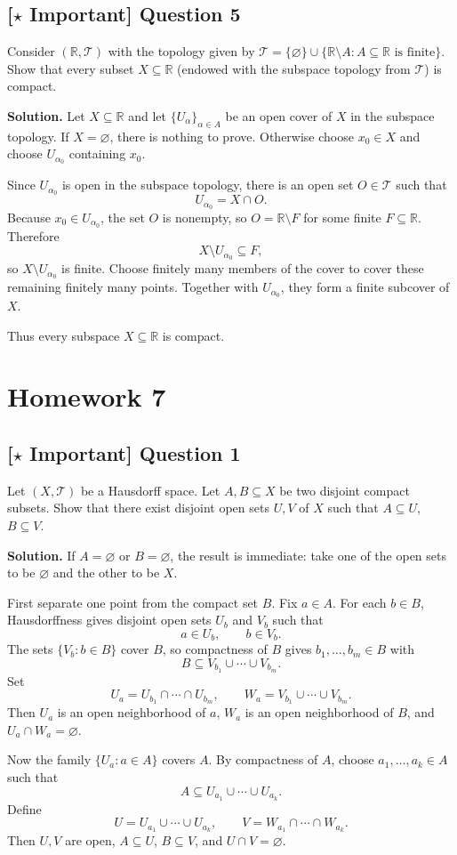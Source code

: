 \documentclass{article}
\newcommand{\R}{\mathbb{R}}
\newcommand{\important}{\texorpdfstring{\textbf{[\(\star\) Important]}}{[Important]}}
\newenvironment{solution}{\par\noindent\textbf{Solution.}\quad}{\par}
\begin{document}
\subsection{\important{} Question 5}
Consider $(\R, \mathcal{T})$ with the topology given by $\mathcal{T} = \{\varnothing\} \cup \{\R \setminus A : A \subseteq \R \text{ is finite}\}$. Show that every subset $X \subseteq \R$ (endowed with the subspace topology from $\mathcal{T}$) is compact.

\begin{solution}
Let $X\subseteq\R$ and let $\{U_\alpha\}_{\alpha\in A}$ be an open cover of
$X$ in the subspace topology. If $X=\varnothing$, there is nothing to
prove. Otherwise choose $x_0\in X$ and choose $U_{\alpha_0}$ containing
$x_0$.

Since $U_{\alpha_0}$ is open in the subspace topology, there is an open
set $O\in\mathcal T$ such that
\[
  U_{\alpha_0}=X\cap O.
\]
Because $x_0\in U_{\alpha_0}$, the set $O$ is nonempty, so
$O=\R\setminus F$ for some finite $F\subseteq\R$. Therefore
\[
  X\setminus U_{\alpha_0}\subseteq F,
\]
so $X\setminus U_{\alpha_0}$ is finite. Choose finitely many members of
the cover to cover these remaining finitely many points. Together with
$U_{\alpha_0}$, they form a finite subcover of $X$.

Thus every subspace $X\subseteq\R$ is compact.
\end{solution}


\section{Homework 7}

\subsection{\important{} Question 1}
Let $(X, \mathcal{T})$ be a Hausdorff space. Let $A, B \subseteq X$ be two disjoint compact subsets. Show that there exist disjoint open sets $U, V$ of $X$ such that $A \subseteq U$, $B \subseteq V$.

\begin{solution}
If $A=\varnothing$ or $B=\varnothing$, the result is immediate: take one
of the open sets to be $\varnothing$ and the other to be $X$.

First separate one point from the compact set $B$. Fix $a\in A$. For each
$b\in B$, Hausdorffness gives disjoint open sets $U_b$ and $V_b$ such that
\[
  a\in U_b,\qquad b\in V_b.
\]
The sets $\{V_b:b\in B\}$ cover $B$, so compactness of $B$ gives
$b_1,\ldots,b_m\in B$ with
\[
  B\subseteq V_{b_1}\cup\cdots\cup V_{b_m}.
\]
Set
\[
  U_a=U_{b_1}\cap\cdots\cap U_{b_m},\qquad
  W_a=V_{b_1}\cup\cdots\cup V_{b_m}.
\]
Then $U_a$ is an open neighborhood of $a$, $W_a$ is an open neighborhood of
$B$, and $U_a\cap W_a=\varnothing$.

Now the family $\{U_a:a\in A\}$ covers $A$. By compactness of $A$, choose
$a_1,\ldots,a_k\in A$ such that
\[
  A\subseteq U_{a_1}\cup\cdots\cup U_{a_k}.
\]
Define
\[
  U=U_{a_1}\cup\cdots\cup U_{a_k},\qquad
  V=W_{a_1}\cap\cdots\cap W_{a_k}.
\]
Then $U,V$ are open, $A\subseteq U$, $B\subseteq V$, and
$U\cap V=\varnothing$.
\end{solution}
\end{document}
